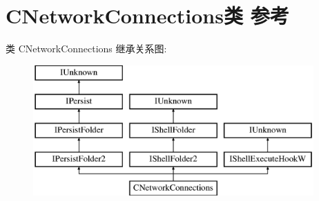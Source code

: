 \hypertarget{class_c_network_connections}{}\section{C\+Network\+Connections类 参考}
\label{class_c_network_connections}
类 C\+Network\+Connections 继承关系图\+:\begin{figure}[H]
\begin{center}
\leavevmode
\includegraphics[height=5.000000cm]{class_c_network_connections}
\end{center}
\end{figure}
